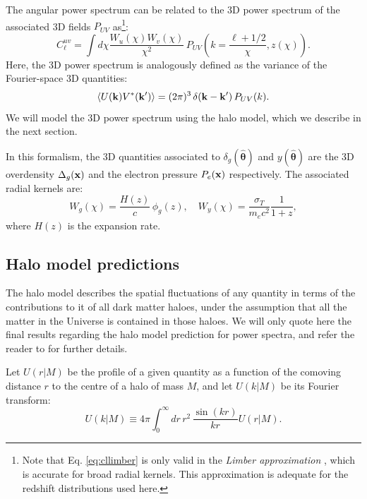 \documentclass[useAMS,usenatbib]{mn2e}
\newcommand{\nv}{\hat{\boldsymbol{\theta}}}
\begin{document}
    The angular power spectrum can be related to the 3D power spectrum of the associated 3D fields $P_{UV}$ as\footnote{Note that Eq. \ref{eq:cllimber} is only valid in the {\sl Limber approximation} \citep{1953ApJ...117..134L}, which is accurate for broad radial kernels. This approximation is adequate for the redshift distributions used here.}:
    \begin{equation}\label{eq:cllimber}
      C_\ell^{uv} = \int d\chi \frac{W_u(\chi)W_v(\chi)}{\chi^2}\,P_{UV}\left(k=\frac{\ell+1/2}{\chi},z(\chi) \right).
    \end{equation}
    Here, the 3D power spectrum is analogously defined as the variance of the Fourier-space 3D quantities:
    \begin{equation}
      \left\langle U({\bf k})V^*({\bf k}')\right\rangle = (2\pi)^3\,\delta({\bf k}-{\bf k}')\,P_{UV}(k).
    \end{equation}
    We will model the 3D power spectrum using the halo model, which we describe in the next section.

    In this formalism, the 3D quantities associated to $\delta_g(\nv)$ and $y(\nv)$ are the 3D overdensity $\Delta_g({\bf x})$ and the electron pressure $P_e({\bf x})$ respectively. The associated radial kernels are:
    \begin{equation}
      W_g(\chi)=\frac{H(z)}{c}\,\phi_g(z),\hspace{12pt}W_y(\chi)=\frac{\sigma_T}{m_ec^2}\frac{1}{1+z},
    \end{equation}
    where $H(z)$ is the expansion rate.

  \subsection{Halo model predictions}\label{ssec:theory.hm}
    The halo model describes the spatial fluctuations of any quantity in terms of the contributions to it of all dark matter haloes, under the assumption that all the matter in the Universe is contained in those haloes. We will only quote here the final results regarding the halo model prediction for power spectra, and refer the reader to \cite{2000MNRAS.318..203S,2000MNRAS.318.1144P,2002PhR...372....1C} for further details.
    
    Let $U(r|M)$ be the profile of a given quantity as a function of the comoving distance $r$ to the centre of a halo of mass $M$, and let $U(k|M)$ be its Fourier transform:
    \begin{equation}
      U(k|M)\equiv4\pi \int_0^\infty dr\,r^2\,\frac{\sin(kr)}{kr}U(r|M).
    \end{equation}
\end{document}
